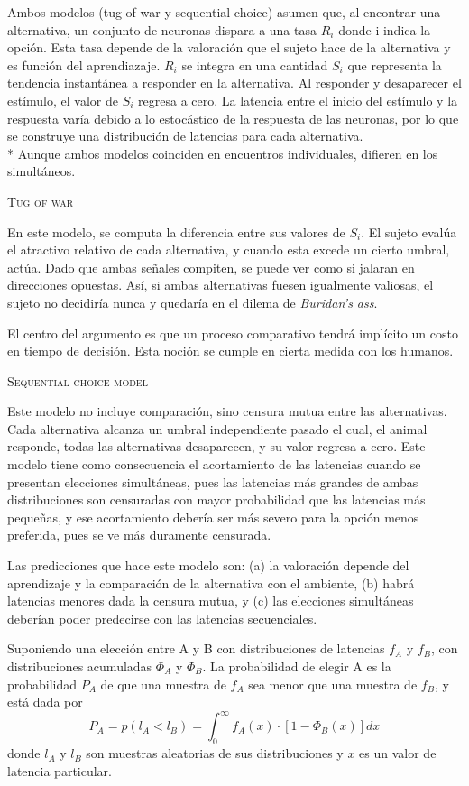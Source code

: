 \documentclass[a4paper,12pt]{article}
\begin{document}
Ambos modelos (tug of war y sequential choice) asumen que, al encontrar una alternativa, un conjunto de neuronas dispara a una tasa $R_i$ donde i indica la opción. Esta tasa depende de la valoración que el sujeto hace de la alternativa y es función del aprendiazaje. $R_i$ se integra en una cantidad $S_i$ que representa la tendencia instantánea a responder en la alternativa. Al responder y desaparecer el estímulo, el valor de $S_i$ regresa a cero. La latencia entre el inicio del estímulo y la respuesta varía debido a lo estocástico de la respuesta de las neuronas, por lo que se construye una distribución de latencias para cada alternativa.\\*
Aunque ambos modelos coinciden en encuentros individuales, difieren en los simultáneos.

{\scshape Tug of war}

En este modelo, se computa la diferencia entre sus valores de $S_i$. El sujeto evalúa el atractivo relativo de cada alternativa, y cuando esta excede un cierto umbral, actúa. Dado que ambas señales compiten, se puede ver como si jalaran en direcciones opuestas. Así, si ambas alternativas fuesen igualmente valiosas, el sujeto no decidiría nunca y quedaría en el dilema de {\slshape Buridan's ass}.

El centro del argumento es que un proceso comparativo tendrá implícito un costo en tiempo de decisión. Esta noción se cumple en cierta medida con los humanos.

{\scshape Sequential choice model}

Este modelo no incluye comparación, sino censura mutua entre las alternativas. Cada alternativa alcanza un umbral independiente pasado el cual, el animal responde, todas las alternativas desaparecen, y su valor regresa a cero. Este modelo tiene como consecuencia el acortamiento de las latencias cuando se presentan elecciones simultáneas, pues las latencias más grandes de ambas distribuciones son censuradas con mayor probabilidad que las latencias más pequeñas, y ese acortamiento debería ser más severo para la opción menos preferida, pues se ve más duramente censurada.

Las predicciones que hace este modelo son: (a) la valoración depende del aprendizaje y la comparación de la alternativa con el ambiente, (b) habrá latencias menores dada la censura mutua, y (c) las elecciones simultáneas deberían poder predecirse con las latencias secuenciales.

Suponiendo una elección entre A y B con distribuciones de latencias $f_A$ y $f_B$, con distribuciones acumuladas $\Phi_A$ y $\Phi_B$. La probabilidad de elegir A es la probabilidad $P_A$ de que una muestra de $f_A$ sea menor que una muestra de $f_B$, y está dada por $$P_A=p(l_A<l_B)=\int_0^\infty f_A(x)\cdot[1-\Phi_B(x)]dx$$ donde $l_A$ y $l_B$ son muestras aleatorias de sus distribuciones y $x$ es un valor de latencia particular.
\end{document}
